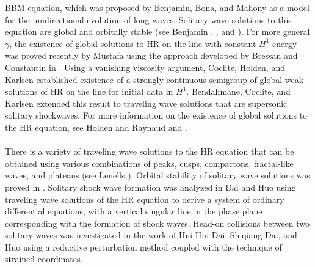 \documentclass[a0,portrait]{a0poster}
\begin{document}
\begin{multicols}{3}
BBM equation, which was proposed by 
Benjamin, Bona, and Mahony 
\cite{Benjamin_1972_Model-equations} as a model for 
the unidirectional evolution of long waves.
Solitary-wave solutions to this 
equation are global and orbitally stable (see Benjamin 
\cite{Benjamin_1972_The-stability-o}, 
\cite{Benjamin_1972_Model-equations}, and 
\cite{Constantin_2000_Stability-of-a-}).
For more general $\gamma$, the existence of global 
solutions to HR on the line with constant $H^1$ energy
was proved recently by Mustafa \cite{Mustafa_2007_Global-conserva}
using the approach developed by Bressan and 
Constantin in \cite{Bressan_2007_Global-conserva}. Using a vanishing 
viscosity argument, Coclite, 
Holden, and Karlsen \cite{Coclite_2005_Global-weak-sol}
established existence of a strongly continuous semigroup of global 
weak solutions of HR on the line for initial data in $H^1$.
Bendahmane, Coclite, and Karlsen 
\cite{Bendahmane_2006_Hsp-1-perturbat} extended this result to traveling 
wave solutions that are supersonic solitary shockwaves.
For more information on the existence of global solutions to the HR
equation, see Holden and Raynaud \cite{Holden_2007_Global-conserva}
and \cite{Yin_2003_On-the-Cauchy-p}. 
\\
\\
There is a variety of traveling wave solutions to the HR equation that can be 
obtained using various combinations of peaks, cusps, compactons, 
fractal-like waves, and plateaus (see Lenells 
\cite{Lenells_2006_Traveling-waves}). Orbital stability of solitary wave 
solutions was proved in \cite{Constantin_2000_Stability-of-a-}.
Solitary shock wave formation was 
analyzed in Dai and Huo \cite{Dai_2000_Solitary-shock-} using traveling 
wave solutions of the HR equation to derive a system of ordinary differential 
equations, with a vertical singular line in the phase plane corresponding with the 
formation of shock waves. Head-on collisions between two solitary 
waves was investigated in the work of Hui-Hui Dai, 
Shiqiang Dai, and Huo \cite{Dai_2000_Head-on-collisi} using a reductive 
perturbation method coupled with the technique of strained coordinates. 
\section*{}



\end{multicols}
\end{document}
